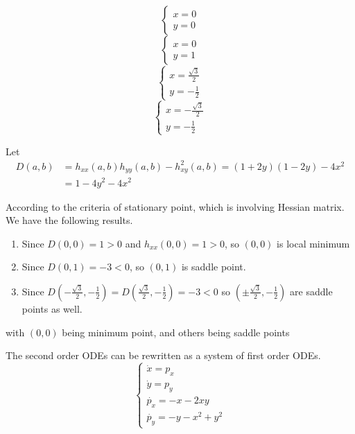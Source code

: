 \documentclass{article}
\begin{document}
\begin{equation}
	\begin{cases}
		x = 0 \\
		y = 0
	\end{cases}
\end{equation}
\begin{equation}
	\begin{cases}
		x = 0 \\
		y = 1
	\end{cases}
\end{equation}
\begin{equation}
	\begin{cases}
		x = \frac{\sqrt{3}}{2} \\
		y = -\frac{1}{2}
	\end{cases}
\end{equation}
\begin{equation}
	\begin{cases}
		x = -\frac{\sqrt{3}}{2} \\
		y = -\frac{1}{2}
	\end{cases}
\end{equation}

Let \begin{align*}
		D(a, b) &= h_{xx}(a, b)h_{yy}(a, b) - h_{xy}^{2}(a, b) = (1 + 2y)(1 - 2y) - 4x^2 \\ 
				&= 1- 4y^2 - 4x^2
	\end{align*}

According to the criteria of stationary point, which is involving Hessian matrix. We have the following results.
\begin{enumerate}
	\item Since $D(0, 0) = 1 > 0$ and $h_{xx}(0,0) = 1 > 0$, so $(0,0)$ is local minimum
	\item Since $D(0, 1) = -3 < 0$, so $(0, 1)$ is saddle point.
	\item Since $D\left(-\frac{\sqrt{3}}{2}, -\frac{1}{2}\right) = D\left(\frac{\sqrt{3}}{2}, -\frac{1}{2}\right) = -3 < 0$ so $\left(\pm\frac{\sqrt{3}}{2}, -\frac{1}{2}\right)$ are saddle points as well.
\end{enumerate}

with $(0,0)$ being minimum point, and others being saddle points

The second order ODEs can be rewritten as a system of first order ODEs.
\begin{equation}
	\begin{cases}
		\dot{x} = p_x\\
		\dot{y} = p_y\\
		\dot{p_x} = -x - 2xy \\
		\dot{p_y} = -y -x^2 + y^2 
	\end{cases}
\end{equation}
\end{document}
